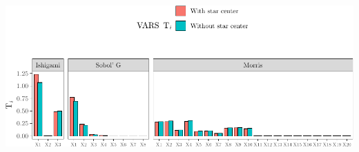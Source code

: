 \documentclass[11pt,]{article}
\begin{document}
\includegraphics{code_vars_design_files/figure-latex/plot-1.pdf}
\end{document}
